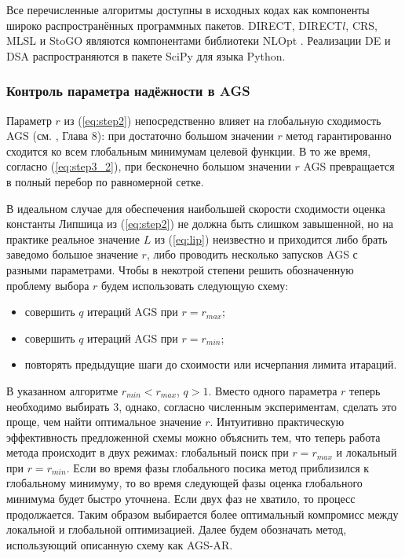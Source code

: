 Все перечисленные алгоритмы доступны в исходных кодах как компоненты широко распространённых программных пакетов.
DIRECT, DIRECT$l$, CRS, MLSL и StoGO являются компонентами библиотеки NLOpt \cite{nlopt}.
Реализации DE и DSA распространяются в пакете SciPy \cite{scipy} для языка Python.

\subsubsection{Контроль параметра надёжности в AGS}

Параметр $r$ из (\ref{eq:step2}) непосредственно влияет на глобальную сходимость AGS (см. \cite{strSergGO}, Глава 8):
при достаточно большом значении $r$ метод гарантированно сходится ко всем глобальным минимумам целевой функции.
В то же время, согласно (\ref{eq:step3_2}), при бесконечно большом значении $r$ AGS превращается в полный перебор
по равномерной сетке.

В идеальном случае для обеспечения наибольшей скорости сходимости оценка константы Липшица из (\ref{eq:step2})
не должна быть слишком завышенной, но на практике реальное значение $L$ из (\ref{eq:lip}) неизвестно и приходится
либо брать заведомо большое значение $r$, либо проводить несколько запусков AGS с разными параметрами. Чтобы в некотрой
степени решить обозначенную проблему выбора $r$ будем использовать следующую схему:
\begin{itemize}
  \item совершить $q$ итераций AGS при $r=r_{max}$;
  \item совершить $q$ итераций AGS при $r=r_{min}$;
  \item повторять предыдущие шаги до схоимости или исчерпания лимита итараций.
\end{itemize}

В указанном алгоритме $r_{min} < r_{max}$, $q > 1$. Вместо одного параметра $r$ теперь
необходимо выбирать 3, однако, согласно численным экспериментам, сделать это проще, чем найти оптимальное значение $r$.
Интуитивно практическую эффективность предложенной схемы можно объяснить тем, что теперь работа метода происходит в
двух режимах: глобальный поиск при $r=r_{max}$ и локальный при $r=r_{min}$. Если во время фазы глобального посика
метод приблизился к глобальному минимуму, то во время следующей фазы оценка глобального минимума будет быстро уточнена.
Если двух фаз не хватило, то процесс продолжается. Таким образом выбирается более оптимальный компромисс
между локальной и глобальной оптимизацией. Далее будем обозначать метод, использующий описанную схему как AGS-AR.

